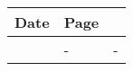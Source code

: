 \chapter*{}
\vspace{-1.5cm}
    \begin{minipage}[r]{.95\textwidth}\raggedleft
    \HUGE\bfseries\ErrataName
    \end{minipage}

\vspace{2.5cm}

\noindent
\lipsum[1]
\vspace{.5cm}
\begin{longtable}{p{2.5cm}p{1.45cm}p{9cm}}
	Date & Page&   \\\hline
\Date	& -	& -
\end{longtable}